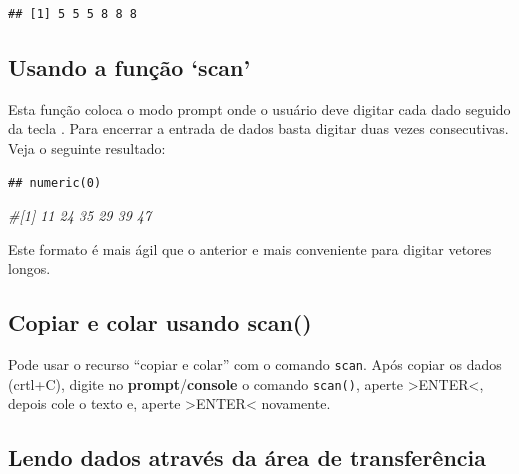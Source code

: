 \documentclass[]{book}
\newenvironment{Shaded}{\begin{snugshade}}{\end{snugshade}}
\newcommand{\CommentTok}[1]{\textcolor[rgb]{0.56,0.35,0.01}{\textit{#1}}}
\newcommand{\KeywordTok}[1]{\textcolor[rgb]{0.13,0.29,0.53}{\textbf{#1}}}
\newcommand{\NormalTok}[1]{#1}
\newcommand{\StringTok}[1]{\textcolor[rgb]{0.31,0.60,0.02}{#1}}
\begin{document}
\begin{verbatim}
## [1] 5 5 5 8 8 8
\end{verbatim}

\hypertarget{usando-a-funcao-scan}{%
\subsection{Usando a função `scan'}\label{usando-a-funcao-scan}}

Esta função coloca o modo prompt onde o usuário deve digitar cada dado seguido da tecla . Para encerrar a entrada de dados basta digitar duas vezes consecutivas. Veja o seguinte resultado:

\begin{Shaded}
\end{Shaded}

\begin{verbatim}
## numeric(0)
\end{verbatim}

\begin{Shaded}
\begin{Highlighting}[]
\CommentTok{#[1] 11 24 35 29 39 47}
\end{Highlighting}
\end{Shaded}

Este formato é mais ágil que o anterior e mais conveniente para digitar vetores longos.

\hypertarget{copiar-e-colar-usando-scan}{%
\subsection{Copiar e colar usando scan()}\label{copiar-e-colar-usando-scan}}

Pode usar o recurso ``copiar e colar'' com o comando \texttt{scan}.
Após copiar os dados (crtl+C), digite no \textbf{prompt}/\textbf{console} o comando \texttt{scan()}, aperte \textgreater ENTER\textless, depois cole o texto e, aperte \textgreater ENTER\textless{} novamente.

\hypertarget{lendo-dados-atraves-da-area-de-transferencia}{%
\subsection{Lendo dados através da área de transferência}\label{lendo-dados-atraves-da-area-de-transferencia}}
\end{document}
